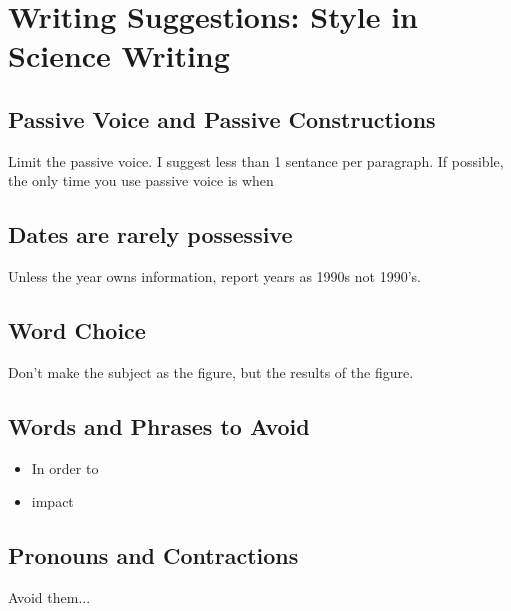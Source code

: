 \documentclass{tufte-handout}\usepackage[]{graphicx}\usepackage[]{color}
\begin{document}


\section{Writing Suggestions: Style in Science Writing}

\subsection{Passive Voice and Passive Constructions}

Limit the passive voice. I suggest less than 1 sentance per paragraph. If possible, the only time you use passive voice is when 

\subsection{Dates are rarely possessive}

Unless the year owns information, report years as 1990s not 1990's. 

\subsection{Word Choice}

Don't make the subject as the figure, but the results of the figure.

\subsection{Words and Phrases to Avoid}

\begin{itemize}
  \item In order to
  \item impact
\end{itemize}


\subsection{Pronouns and Contractions}

Avoid them...
\end{document}
